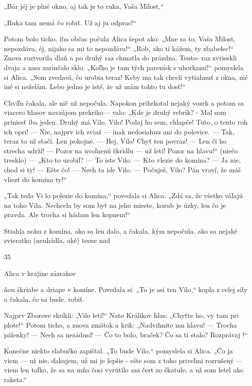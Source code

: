 \documentclass[12pt]{book}
\begin{document}
\begin{Parallel}[p]{}{}
{„Bár jéj je plné okno, aj tak je to ruka, Vaša Milost,“

„Ruka tam nemá čo robiť. Už aj ju odprac!“

Potom bolo ticho, iba občas počula Alica šepot ako:
„Mne sa to, Vaša Milost, nepozdáva, éj, nijako sa mi to
nepozdáva!“ „Rob, ako tí kážem, ty zbabelec!“ Znova
roztvorila dlaň a po druhý raz chmatla do prázdna. Tento-
raz zvrieskli dvaja a zasa zarinčalo sklo. „Koľko je tam tých
parenísk s uhorkami!“ pomyslela si Alica. „Som zvedavá,
čo urobia teraz! Keby ma tak chceli vytiahnuť z okna, nič
iné si neželám. Lebo jedno je isté, že už mám tohto tu
dosť!“

Chvíľu čakala, ale nič už nepočula. Napokon prihrkotal
nejaký vozrk a potom sa viacero hlasov navzájom prekriko—
valo: „Kde je druhý rebrík? - Mal som priniesť iba jeden.
Druhý má Vilo. Vilo! Podaj ho sem, chlapče! Tuto, o tento
roh ich opri! — Nie, najprv ich zviaž — inak nedosiahnu ani
do polovice. — Tak, teraz to už stačí. Len pokojne. — Hej,
Vilo! Chyť ten povraz! — Len či ho strecha udrží! — Pozor
na uvoľnenú škridlu — už letí! Pozor na hlavu!“ (niečo
tresklo) — „Kto to urobil? — To iste Vilo. — Kto vlezie do
komína? — Ja nie, chod si ty! — Ešte čo! — Nech ta ide
Vilo. — Počuješ, Vilo? Pán vraví, že máš vliezť do komína
ty!“

„Tak teda Vi lo polezie do komína,“ povedala si Alica.
„Zdá sa, že všetko váľajú na toho Vila. Nechcela by som
byť na jeho mieste, kozub je úzky, len čo je pravda. Ale
trocha si hádam len kopnem!“

Stiahla nohu z komína, ako sa len dalo, a čakala, kým
nepočula, ako sa nejaké zvieratko (neuhádla, aké) tesne nad

35

 

Alica v krajine zázrakov

ňou škriabe a driape v komíne. Povedala si: „To je asi ten
Vilo,“ kopla z celej sily a čakala, čo sa bude. robiť.

Najprv Zborove skríkli: „Vilo letí!“ Nato Králikov hlas:
„Chyťte ho, vy tam pri plote!“ Potom ticho, a znova zmätok
a krik: „Nadvihnite mu hlavu! — Trocha pálenky! — Nech
sa nezadusí! — Čo to bolo, braček? Čo sa ti stalo?
Rozprávaj !“

Konečne niekto slabučko zapišťal. „To bude Vilo,“
pomyslela si Alica. „Čo ja viem — už nie, ďakujem, už mi je
lepšie - ešte som z toho priveľmi rozrušený — viem len
toľko, že sa na mňa čosi vyrútilo ani čert zo škatule, a už
som letel ako raketa.“

}
\end{Parallel}
\end{document}
